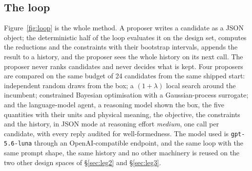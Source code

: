 \documentclass{article}
\begin{document}
\subsection{The loop}
\label{sec:loop}
Figure~\ref{fig:loop} is the whole method. A proposer writes a candidate as a JSON object; the deterministic half of the loop evaluates it on the design set, computes the reductions and the constraints with their bootstrap intervals, appends the result to a history, and the proposer sees the whole history on its next call. The proposer never ranks candidates and never decides what is kept. Four proposers are compared on the same budget of 24 candidates from the same shipped start: independent random draws from the box; a $(1+\lambda)$ local search around the incumbent; constrained Bayesian optimisation with a Gaussian-process surrogate; and the language-model agent, a reasoning model shown the box, the five quantities with their units and physical meaning, the objective, the constraints and the history, in JSON mode at reasoning effort \emph{medium}, one call per candidate, with every reply audited for well-formedness. The model used is \texttt{gpt-5.6-luna} through an OpenAI-compatible endpoint, and the same loop with the same prompt shape, the same history and no other machinery is reused on the two other design spaces of §\ref{sec:leg2} and §\ref{sec:leg3}.
\end{document}
